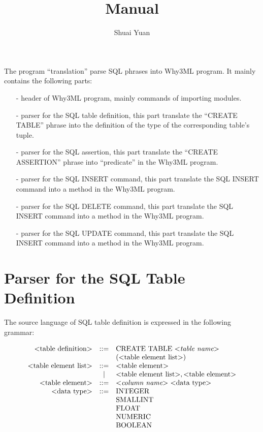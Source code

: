 \documentclass[a4paper]{article}
\title{Manual}
\author{Shuai Yuan}
\date{}
\begin{document}
\maketitle{}

\newcommand{\bdm}
{
\begin{displaymath}
\begin{array}{rcl}
}
\newcommand{\edm}
{
\end{array}
\end{displaymath}
}

The program ``translation'' parse SQL phrases into Why3ML program. It mainly contains the following parts:
\begin{itemize}
  \item[-] header of Why3ML program, mainly commands of importing modules.
  \item[-] parser for the SQL table definition, this part translate the ``CREATE TABLE'' phrase into the definition of the type of the corresponding table's tuple.
  \item[-] parser for the SQL assertion, this part translate the ``CREATE ASSERTION'' phrase into ``predicate'' in the Why3ML program.
  \item[-] parser for the SQL INSERT command, this part translate the SQL INSERT command into a method in the Why3ML program.
  \item[-] parser for the SQL DELETE command, this part translate the SQL INSERT command into a method in the Why3ML program.
  \item[-] parser for the SQL UPDATE command, this part translate the SQL INSERT command into a method in the Why3ML program.
\end{itemize}

\section{Parser for the SQL Table Definition}
The source language of SQL table definition is expressed in the following grammar:
\bdm
\textrm{$<$table definition$>$} &::=& \textrm{CREATE TABLE \textit{$<$table name$>$}} \\ 
&& \left( \textrm{$<$table element list$>$} \right) \\
\textrm{$<$table element list$>$} &::=& \textrm{$<$table element$>$} \\
&|& \textrm{$<$table element list$>$} , \textrm{$<$table element$>$} \\
\textrm{$<$table element$>$} &::=& \textrm{\textit{$<$column name$>$} $<$data type$>$} \\
\textrm{$<$data type$>$} &::=& \textrm{INTEGER} \\
&& \textrm{SMALLINT} \\
&& \textrm{FLOAT} \\
&& \textrm{NUMERIC} \\
&& \textrm{BOOLEAN} 
\edm
\end{document}
